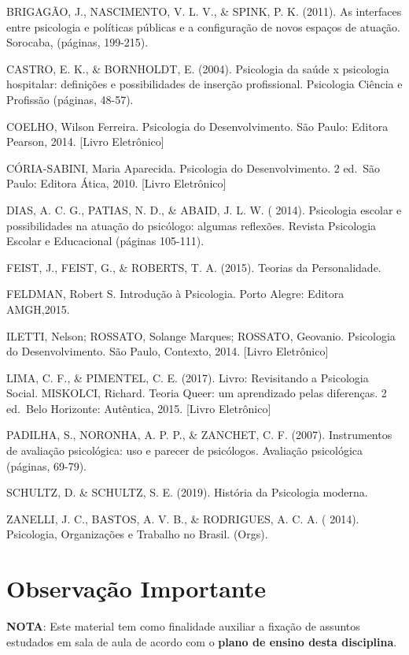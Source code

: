 \documentclass[
]{book}
\begin{document}
BRIGAGÃO, J., NASCIMENTO, V. L. V., \& SPINK, P. K. (2011). As interfaces entre psicologia e políticas públicas e a configuração de novos espaços de atuação. Sorocaba, (páginas, 199-215).

CASTRO, E. K., \& BORNHOLDT, E. (2004). Psicologia da saúde x psicologia hospitalar: definições e possibilidades de inserção profissional. Psicologia Ciência e Profissão (páginas, 48-57).

COELHO, Wilson Ferreira. Psicologia do Desenvolvimento. São Paulo: Editora Pearson, 2014. {[}Livro Eletrônico{]}

CÓRIA-SABINI, Maria Aparecida. Psicologia do Desenvolvimento. 2 ed.~São Paulo: Editora Ática, 2010. {[}Livro Eletrônico{]}

DIAS, A. C. G., PATIAS, N. D., \& ABAID, J. L. W. ( 2014). Psicologia escolar e possibilidades na atuação do psicólogo: algumas reflexões. Revista Psicologia Escolar e Educacional (páginas 105-111).

FEIST, J., FEIST, G., \& ROBERTS, T. A. (2015). Teorias da Personalidade.

FELDMAN, Robert S. Introdução à Psicologia. Porto Alegre: Editora AMGH,2015.

ILETTI, Nelson; ROSSATO, Solange Marques; ROSSATO, Geovanio. Psicologia do Desenvolvimento. São Paulo, Contexto, 2014. {[}Livro Eletrônico{]}

LIMA, C. F., \& PIMENTEL, C. E. (2017). Livro: Revisitando a Psicologia Social. MISKOLCI, Richard. Teoria Queer: um aprendizado pelas diferenças. 2 ed.~Belo Horizonte: Autêntica, 2015. {[}Livro Eletrônico{]}

PADILHA, S., NORONHA, A. P. P., \& ZANCHET, C. F. (2007). Instrumentos de avaliação psicológica: uso e parecer de psicólogos. Avaliação psicológica (páginas, 69-79).

SCHULTZ, D. \& SCHULTZ, S. E. (2019). História da Psicologia moderna.

ZANELLI, J. C., BASTOS, A. V. B., \& RODRIGUES, A. C. A. ( 2014). Psicologia, Organizações e Trabalho no Brasil. (Orgs).

\hypertarget{observauxe7uxe3o-importante}{%
\section{Observação Importante}\label{observauxe7uxe3o-importante}}

\textbf{NOTA}: Este material tem como finalidade auxiliar a fixação de assuntos estudados em sala de aula de acordo com o \textbf{plano de ensino desta disciplina}.
\end{document}
